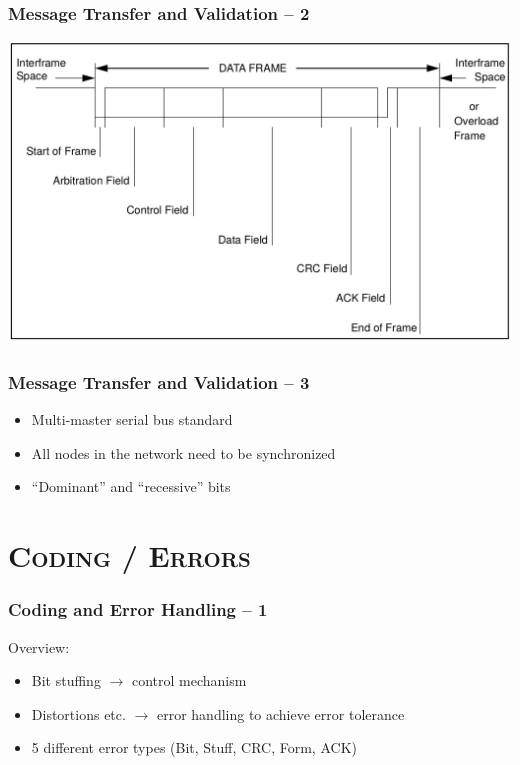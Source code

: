 \documentclass[xcolor=x11names,compress]{beamer}
\renewcommand{\(}{\begin{columns}}
\renewcommand{\)}{\end{columns}}
\newcommand{\<}[1]{\begin{column}{#1}}
\renewcommand{\>}{\end{column}}
\begin{document}
\begin{frame}
  \frametitle{Message Transfer and Validation -- 2}
  
    \centering
    \includegraphics[scale=0.2]{framesetup}

\end{frame}


\begin{frame}
  \frametitle{Message Transfer and Validation -- 3}
  
  \begin{itemize}
    \item Multi-master serial bus standard
    \item All nodes in the network need to be synchronized
    \item ``Dominant'' and ``recessive'' bits
  \end{itemize}

\end{frame}



\section{\scshape Coding / Errors}
\begin{frame}
  \frametitle{Coding and Error Handling -- 1}

  Overview:
  \begin{itemize}
    \item Bit stuffing $\rightarrow$ control mechanism
    \item Distortions etc. $\rightarrow$ error handling to achieve error tolerance
    \item 5 different error types (Bit, Stuff, CRC, Form, ACK)
  \end{itemize}

\end{frame}
\end{document}
